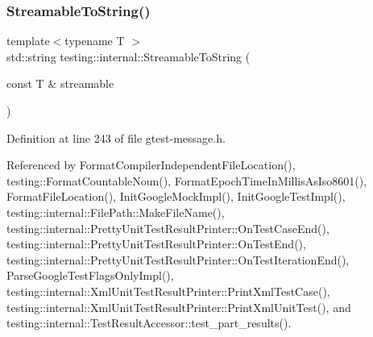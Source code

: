 \subsubsection{\texorpdfstring{Streamable\+To\+String()}{StreamableToString()}}
{\footnotesize\ttfamily template$<$typename T $>$ \\
std\+::string testing\+::internal\+::\+Streamable\+To\+String (\begin{DoxyParamCaption}\item[{const T \&}]{streamable }\end{DoxyParamCaption})}



Definition at line 243 of file gtest-\/message.\+h.



Referenced by Format\+Compiler\+Independent\+File\+Location(), testing\+::\+Format\+Countable\+Noun(), Format\+Epoch\+Time\+In\+Millis\+As\+Iso8601(), Format\+File\+Location(), Init\+Google\+Mock\+Impl(), Init\+Google\+Test\+Impl(), testing\+::internal\+::\+File\+Path\+::\+Make\+File\+Name(), testing\+::internal\+::\+Pretty\+Unit\+Test\+Result\+Printer\+::\+On\+Test\+Case\+End(), testing\+::internal\+::\+Pretty\+Unit\+Test\+Result\+Printer\+::\+On\+Test\+End(), testing\+::internal\+::\+Pretty\+Unit\+Test\+Result\+Printer\+::\+On\+Test\+Iteration\+End(), Parse\+Google\+Test\+Flags\+Only\+Impl(), testing\+::internal\+::\+Xml\+Unit\+Test\+Result\+Printer\+::\+Print\+Xml\+Test\+Case(), testing\+::internal\+::\+Xml\+Unit\+Test\+Result\+Printer\+::\+Print\+Xml\+Unit\+Test(), and testing\+::internal\+::\+Test\+Result\+Accessor\+::test\+\_\+part\+\_\+results().


